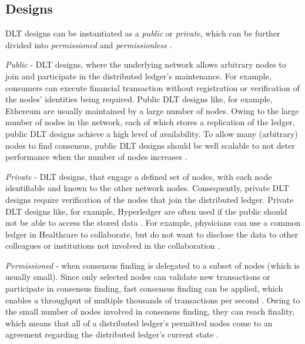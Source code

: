 
\subsection{Designs}
\label{ssec:designs}

DLT designs can be instantiated as a \textit{public} or \textit{private}, which can be further divided into \textit{permissioned} and \textit{permissionless} \cite{dlt_private,dlt_public}. \newline

\textit{Public} - DLT designs, where the underlying network allows arbitrary nodes to join and participate in the distributed ledger’s maintenance. For example, consumers can execute financial transaction without registration or verification of the nodes’ identities being required. Public DLT designs like, for example, Ethereum \cite{ethereum} are usually maintained by a large number of nodes. Owing to the large number of nodes in the network, each of which stores a replication of the ledger, public DLT designs achieve a high level of availability. To allow many (arbitrary) nodes to find consensus, public DLT designs should be well scalable to not deter performance when the number of nodes increases \cite{dlt_1}. \newline

\textit{Private} - DLT designs, that engage a defined set of nodes, with each node identifiable and known to the other network nodes. Consequently, private DLT designs require verification of the nodes that join the distributed ledger. Private DLT designs like, for example, Hyperledger \cite{hyperledger} are often used if the public should not be able to access the stored data \cite{dlt_bott}. For example, physicians can use a common ledger in Healthcare to collaborate, but do not want to disclose the data to other colleagues or institutions not involved in the collaboration \cite{dlt_1}. \newline

\textit{Permissioned} - when consensus finding is delegated to a subset of nodes (which is usually small). Since only selected nodes can validate new transactions or participate in consensus finding, fast consensus finding can be applied, which enables a throughput of multiple thousands of transactions per second \cite{dlt_castro}. Owing to the small number of nodes involved in consensus finding, they can reach finality, which means that all of a distributed ledger’s permitted nodes come to an agreement regarding the distributed ledger’s current state \cite{dlt_1}. \newline

